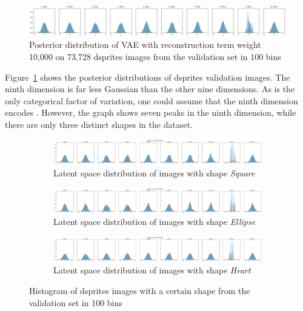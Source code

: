 \begin{figure}
    \centering
    \includegraphics[width=\textwidth]{images/latent_space_entanglement/vae_dsprites_lf_10000_dist.png}
    \caption[VAE Latent Space Distribution - dsprites]{Posterior distribution of \ac{VAE} with reconstruction term weight 10,000 on 73,728 dsprites images from the validation set in 100 bins}
    \label{fig:10000_vae_latent_space_distribution}
\end{figure}

Figure~\ref{fig:10000_vae_latent_space_distribution} shows the posterior distributions of dsprites validation images.
The ninth dimension is far less Gaussian than the other nine dimensions.
As  is the only categorical factor of variation, one could assume that the ninth dimension encodes .
However, the graph shows seven peaks in the ninth dimension, while there are only three distinct shapes in the dataset.

\begin{figure}
    \centering
    \begin{subfigure}{\textwidth}
        \centering
        \includegraphics[width=\textwidth]{images/latent_space_entanglement/vae_dsprites_lf_10000_dist_shape_1.png}
        \caption{Latent space distribution of images with shape \textit{Square}}
    \end{subfigure}
    \begin{subfigure}{\textwidth}
        \centering
        \includegraphics[width=\textwidth]{images/latent_space_entanglement/vae_dsprites_lf_10000_dist_shape_2.png}
        \caption{Latent space distribution of images with shape \textit{Ellipse}}
    \end{subfigure}
    \begin{subfigure}{\textwidth}
        \centering
        \includegraphics[width=\textwidth]{images/latent_space_entanglement/vae_dsprites_lf_10000_dist_shape_3.png}
        \caption{Latent space distribution of images with shape \textit{Heart}}
    \end{subfigure}
    \caption[VAE Latent Space Distribution - dsprites Shapes]{Histogram of dsprites images with a certain shape from the validation set in 100 bins}
    \label{fig:10000_vae_latent_space_distribution_shapes}
\end{figure}

